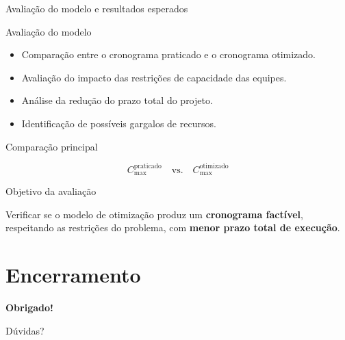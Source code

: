 \documentclass{beamer}
\begin{document}
\begin{frame}{Avaliação do modelo e resultados esperados}

\scriptsize

\begin{block}{Avaliação do modelo}

    \begin{itemize}
        \setlength{\itemsep}{0.12cm}
        \item Comparação entre o cronograma praticado e o cronograma otimizado.
        \item Avaliação do impacto das restrições de capacidade das equipes.
        \item Análise da redução do prazo total do projeto.
        \item Identificação de possíveis gargalos de recursos.
    \end{itemize}

\end{block}

\vspace{0.2cm}

\begin{block}{Comparação principal}

    \begin{center}

        \[
        C_{\max}^{\text{praticado}}
        \quad \text{vs.} \quad
        C_{\max}^{\text{otimizado}}
        \]

    \end{center}

\end{block}

\vspace{0.2cm}

\begin{block}{Objetivo da avaliação}

    Verificar se o modelo de otimização produz um
    \textbf{cronograma factível}, respeitando as restrições do problema,
    com \textbf{menor prazo total de execução}.

\end{block}

\end{frame}
\section{Encerramento}

\begin{frame}

    \centering

    \vfill

    {\Huge \textbf{Obrigado!}}

    \vspace{1cm}

    {\Large Dúvidas?}

    \vfill

\end{frame}

\end{document}
